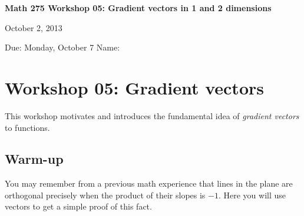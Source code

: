 \documentclass[12pt]{exam}
\theoremstyle{definition}
\begin{document}
\noindent
\textbf{{\large Math 275 \hfill Workshop 05: Gradient vectors in 1 and 2 dimensions}}

\noindent
October 2, 2013 

\noindent
Due: Monday, October 7 \hfill Name: \underline{\hspace{3in}} 

\noindent

\newtheorem{fact}{Fact}

\section{Workshop 05: Gradient vectors}

This workshop motivates and introduces the fundamental idea of
\emph{gradient vectors} to functions.

\subsection{Warm-up}

You may remember from a previous math experience that lines in the plane
are orthogonal precisely when the product of their slopes is $-1$. Here
you will use vectors to get a simple proof of this fact.
\end{document}
